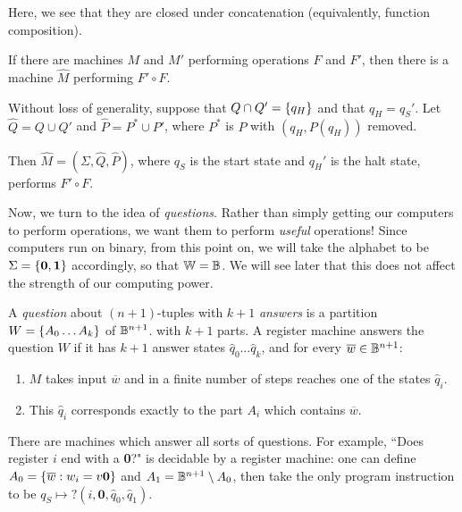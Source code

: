 \documentclass{article}
\begin{document}
Here, we see that they are closed under concatenation (equivalently, function composition).

\begin{theorem}
	\label{subroutine-lemma}
	If there are machines $M$ and $M'$ performing operations $F$ and $F'$, then there is a machine $\hat M$ performing $F' \circ F$.
\end{theorem}

\begin{prf}
	Without loss of generality, suppose that $Q \cap Q' = \left\lbrace q_H \right\rbrace$ and that $q_H = q_S'$. Let $\hat Q = Q \cup Q'$ and $\hat P = P^* \cup P'$, where $P^*$ is $P$ with $(q_H, P(q_H))$ removed.
	    
	Then $\hat M = (\Sigma, \hat Q, \hat P)$, where $q_S$ is the start state and $q_H'$ is the halt state, performs $F' \circ F$.
\end{prf}

Now, we turn to the idea of \textit{questions}. Rather than simply getting our computers to perform operations, we want them to perform \textit{useful} operations! Since computers run on binary, from this point on, we will take the alphabet to be $\Sigma = \left\lbrace \textbf{0}, \textbf{1} \right\rbrace$ accordingly, so that $\mathbb{W} = \mathbb{B}$. We will see later that this does not affect the strength of our computing power.

\begin{definition}
	A \textit{question} about $(n+1)$-tuples with $k+1$ \textit{answers} is a partition $W = \left\lbrace A_0 \dots A_k \right\rbrace$ of $\mathbb{B}^{n+1}$. with $k+1$ parts. A register machine answers the question $W$ if it has $k+1$ answer states $\hat q_0 \dots \hat q_k$, and for every $\overline w \in \mathbb{B}^{n+1}$:
	\begin{enumerate}
		\item $M$ takes input $\overline w$ and in a finite number of steps reaches one of the states $\hat q_i$.
		\item This $\hat q_i$ corresponds exactly to the part $A_i$ which contains $\overline w$.
	\end{enumerate}
\end{definition}

There are machines which answer all sorts of questions. For example, ``Does register $i$ end with a \textbf{0}?" is decidable by a register machine: one can define $A_0 = \left\lbrace \overline w: w_i = v\textbf{0} \right\rbrace$ and $A_1 = \mathbb{B}^{n+1} \setminus A_0$, then take the only program instruction to be $q_S \mapsto ?(i, \textbf{0}, \hat q_0, \hat q_1)$.
\end{document}
